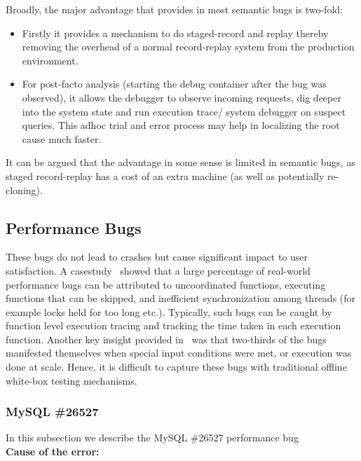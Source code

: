 Broadly, the major advantage that \parikshan provides in most semantic bugs is two-fold: 

\begin{itemize}
	\item Firstly it provides a mechanism to do staged-record and replay thereby removing the overhead of a normal record-replay system from the production environment.
	\item For post-facto analysis (starting the debug container after the bug was observed), it allows the debugger to observe incoming requests, dig deeper into the system state and run execution trace/ system debugger on suspect queries. This adhoc trial and error process may help in localizing the root cause much faster.
\end{itemize}

It can be argued that the advantage in some sense is limited in semantic bugs, as staged record-replay has a cost of an extra machine (as well as potentially re-cloning).\\

\subsection{Performance Bugs}

These bugs do not lead to crashes but cause significant impact to user satisfaction.
A casestudy~\cite{shanluPerf} showed that a large percentage of real-world performance bugs can be attributed to uncoordinated functions, executing functions that can be skipped, and inefficient synchronization among threads (for example locks held for too long etc.).
Typically, such bugs can be caught by function level execution tracing and tracking the time taken in each execution function.
Another key insight provided in~\cite{shanluPerf} was that two-thirds of the bugs manifested themselves when special input conditions were met, or execution was done at scale. 
Hence, it is difficult to capture these bugs with traditional offline white-box testing mechanisms.


\subsubsection{MySQL \#26527}

In this subsection we describe the MySQL \#26527 performance bug \\

\noindent \textbf{Cause of the error:} \\

